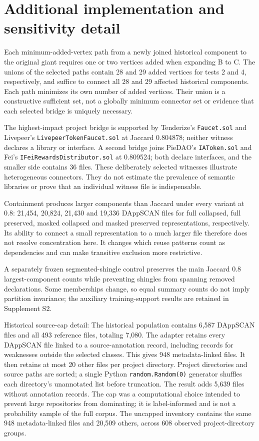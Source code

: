 \documentclass[preprint,12pt]{elsarticle}
\begin{document}
\section{Additional implementation and sensitivity detail}\label{additional-implementation-and-sensitivity-detail}

Each minimum-added-vertex path from a newly joined historical component to the original giant requires one or two vertices added when expanding B to C. The unions of the selected paths contain 28 and 29 added vertices for tests 2 and 4, respectively, and suffice to connect all 28 and 29 affected historical components. Each path minimizes its own number of added vertices. Their union is a constructive sufficient set, not a globally minimum connector set or evidence that each selected bridge is uniquely necessary.

The highest-impact project bridge is supported by Tenderize's \texttt{Faucet.sol} and Livepeer's \texttt{LivepeerTokenFaucet.sol} at Jaccard 0.804878; neither witness declares a library or interface. A second bridge joins PieDAO's \texttt{IAToken.sol} and Fei's \nolinkurl{IFeiRewardsDistributor.sol} at 0.809524; both declare interfaces, and the smaller side contains 36 files. These deliberately selected witnesses illustrate heterogeneous connectors. They do not estimate the prevalence of semantic libraries or prove that an individual witness file is indispensable.

Containment produces larger components than Jaccard under every variant at 0.8: 21,454, 20,824, 21,430 and 19,336 DAppSCAN files for full collapsed, full preserved, masked collapsed and masked preserved representations, respectively. Its ability to connect a small representation to a much larger file therefore does not resolve concentration here. It changes which reuse patterns count as dependencies and can make transitive exclusion more restrictive.

A separately frozen segmented-shingle control preserves the main Jaccard 0.8 largest-component counts while preventing shingles from spanning removed declarations. Some memberships change, so equal summary counts do not imply partition invariance; the auxiliary training-support results are retained in Supplement S2.

Historical source-cap detail: The historical population contains 6,587 DAppSCAN files and all 493 reference files, totaling 7,080. The adapter retains every DAppSCAN file linked to a source-annotation record, including records for weaknesses outside the selected classes. This gives 948 metadata-linked files. It then retains at most 20 other files per project directory. Project directories and source paths are sorted; a single Python \texttt{random.Random(0)} generator shuffles each directory's unannotated list before truncation. The result adds 5,639 files without annotation records. The cap was a computational choice intended to prevent large repositories from dominating; it is label-informed and is not a probability sample of the full corpus. The uncapped inventory contains the same 948 metadata-linked files and 20,509 others, across 608 observed project-directory groups.
\end{document}
